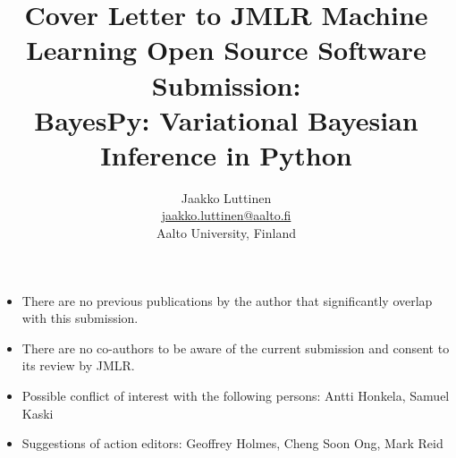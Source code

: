 \documentclass{article}
\title{Cover Letter to JMLR Machine Learning Open Source Software Submission:\\
BayesPy: Variational Bayesian Inference in Python}
\author{Jaakko Luttinen\\
  \url{jaakko.luttinen@aalto.fi}\\
    Aalto University, Finland}
\begin{document}
\maketitle

\begin{itemize}

\item There are no previous publications by the author that significantly
  overlap with this submission.

\item There are no co-authors to be aware of the current submission and consent
  to its review by JMLR.

\item Possible conflict of interest with the following persons: Antti Honkela,
  Samuel Kaski

\item Suggestions of action editors: Geoffrey Holmes, Cheng Soon Ong, Mark Reid

\end{itemize}
\end{document}
